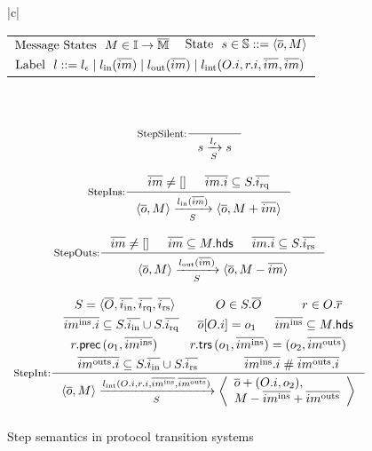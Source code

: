 \begin{figure}[t]
  \centering
  \begin{tabular}{|c|}
    \hline
     \\
    \begin{tabular}{lr}
      $\textrm{Message States}\ \ M \in \mathbb{I}{} \to \overline{\mathbb{M}}$ &
      $\textrm{State}\ \ s \in \mathbb{S}{} ::= \langle \overline{o}, M \rangle$ \\
      \multicolumn{2}{l}{$\textrm{Label}\ \ l ::= l_\epsilon{}\; |\; l_{\textrm{in}}(\overline{im})\; |\; l_{\textrm{out}}(\overline{im})\; |\; l_{\textrm{int}}(O.i, r.i, \overline{im}, \overline{im})$} \\
    \end{tabular}\\
     \\
    \begin{math}
      \begin{array}{c}
        \inference[StepSilent:]{}{\semstep{S}{s}{\lblEmpty{}}{s}}\bigskip\\
        \inference[StepIns:]{\listof{im} \neq \listnil
          & \listof{\idxOf{im}} \subseteq \hsysRqA{S}}{\semstep{S}
          {\hst{\listof{o}}{M}}
          {\lblIns{\listof{im}}}
          {\hst{\listof{o}}{\enqMsgs{M}{\listof{im}}}}}\bigskip \\
        \inference[StepOuts:]{\listof{im} \neq \listnil
          & \listof{im} \subseteq \heads{M}
          & \listof{\idxOf{im}} \subseteq \hsysRsA{S}}{\semstep{S}
          {\hst{\listof{o}}{M}}
          {\lblOuts{\listof{im}}}
          {\hst{\listof{o}}{\deqMsgs{M}{\listof{im}}}}}\bigskip \\
        \inference[StepInt:]{S = \hsyss{\listof{O}}{i}
          & O \in S.\listof{O}
          & r \in O.\listof{r}\smallskip \\
          \midxIns{im} \subseteq \hsysInA{S} \cup \hsysRqA{S}
          & \listof{o}[\idxOf{O}] = o_1
          & \msgIns{im} \subseteq \heads{M}\smallskip \\
          \rprecOf{r}\, (o_1, \msgIns{im})
          & \rtrsOf{r}\, (o_1, \msgIns{im}) = (o_2, \msgOuts{im})\smallskip \\
          \midxOuts{im} \subseteq \hsysInA{S} \cup \hsysRsA{S}
          & \disj{\midxIns{im}}{\midxOuts{im}}}{\semstep{S}
          {\hst{\listof{o}}{M}}
          {\lblInt{\idxOf{O}}{\idxOf{r}}{\msgIns{im}}{\msgOuts{im}}}
          {\hstm{\mapupd{\listof{o}}{\idxOf{O}}{o_2}}{\enqMsgs{\deqMsgs{M}{\msgIns{im}}}{\msgOuts{im}}}}}\medskip \\
      \end{array}
    \end{math}\\
    \hline
  \end{tabular}
  \caption{Step semantics in protocol transition systems}
  \label{fig-trs-semantics-steps}
\end{figure}

